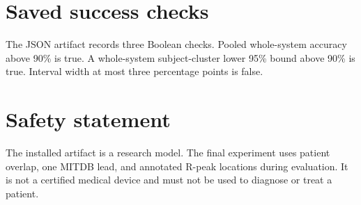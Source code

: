 \section{Saved success checks}

The JSON artifact records three Boolean checks. Pooled whole-system accuracy
above 90\% is true. A whole-system subject-cluster lower 95\% bound above 90\%
is true. Interval width at most three percentage points is false.

\section{Safety statement}

The installed artifact is a research model. The final experiment uses patient
overlap, one MITDB lead, and annotated R-peak locations during evaluation. It
is not a certified medical device and must not be used to diagnose or treat a
patient.
